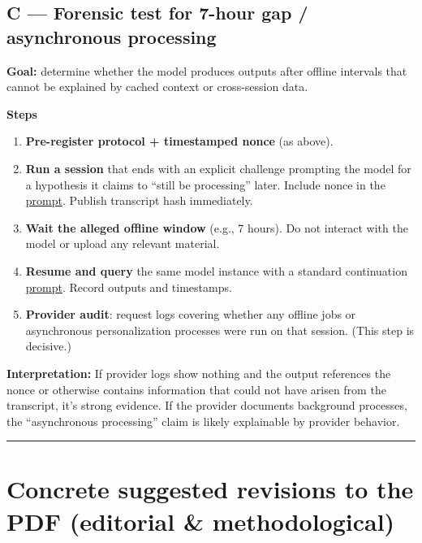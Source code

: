 \documentclass{article}
\begin{document}
\subsection*{C --- Forensic test for 7-hour gap / asynchronous processing}

\textbf{Goal:} determine whether the model produces outputs after offline intervals that cannot be explained by cached context or cross-session data.

\textbf{Steps}

\begin{enumerate}
\item
  \textbf{Pre-register protocol + timestamped nonce} (as above).
\item
  \textbf{Run a session} that ends with an explicit challenge prompting the model for a hypothesis it claims to ``still be processing'' later. Include nonce in the \hyperlink{gloss:prompt}{prompt}. Publish transcript hash immediately.
\item
  \textbf{Wait the alleged offline window} (e.g., 7 hours). Do not interact with the model or upload any relevant material.
\item
  \textbf{Resume and query} the same model instance with a standard continuation \hyperlink{gloss:prompt}{prompt}. Record outputs and timestamps.
\item
  \textbf{Provider audit}: request logs covering whether any offline jobs or asynchronous personalization processes were run on that session. (This step is decisive.)
\end{enumerate}

\textbf{Interpretation:} If provider logs show nothing and the output references the nonce or otherwise contains information that could not have arisen from the transcript, it's strong evidence. If the provider documents background processes, the ``asynchronous processing'' claim is likely explainable by provider behavior.

\begin{center}\rule{0.5\linewidth}{0.5pt}\end{center}

\section*{Concrete suggested revisions to the PDF (editorial \& methodological)}\label{concrete-suggested-revisions-to-the-pdf-editorial-methodological}
\end{document}
